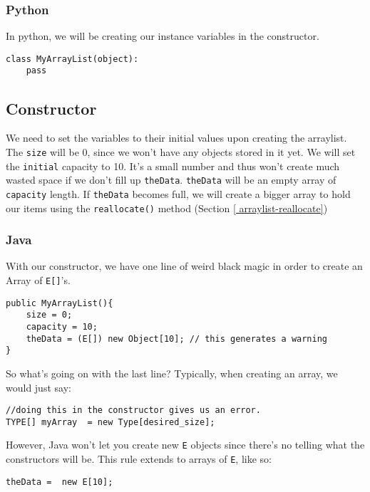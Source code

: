 \subsubsection{Python}
In python, we will be creating our instance variables in the constructor.

\begin{verbatim}
class MyArrayList(object):
	pass
\end{verbatim}


\subsection{Constructor}

We need to set the variables to their initial values upon creating the arraylist.
The \texttt{size} will be 0, since we won't have any objects stored in it yet.
We will set the \texttt{initial} capacity to 10.  
It's a small number and thus won't create much wasted space if we don't fill up \texttt{theData}.
\texttt{theData} will be an empty array of \texttt{capacity} length.
If \texttt{theData} becomes full, we will create a bigger array to hold our items using the \texttt{reallocate()} method (Section \ref{
arraylist-reallocate})  %


\subsubsection{Java}
With our constructor, we have one line of weird black magic in order to create an Array of \texttt{E[]}'s.
\begin{verbatim}
public MyArrayList(){
	size = 0;
	capacity = 10;
	theData = (E[]) new Object[10]; // this generates a warning
}
\end{verbatim}

So what's going on with the last line?
Typically, when creating an array, we would just say:

\begin{verbatim}
//doing this in the constructor gives us an error.
TYPE[] myArray  = new Type[desired_size];
\end{verbatim}

However, Java won't let you create new \texttt{E} objects since there's no telling what the constructors will be.  This rule extends to arrays of \texttt{E}, like so:
\begin{verbatim}
theData =  new E[10];
\end{verbatim}

